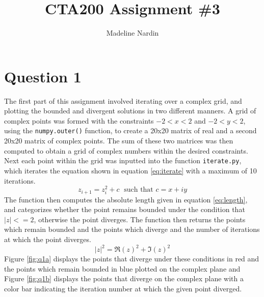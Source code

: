 \documentclass[10pt, preprint]{aastex}
\title{CTA200 Assignment \#3}
\author{Madeline Nardin}
\begin{document}
\section{Question 1}
The first part of this assignment involved iterating over a complex grid, and plotting the bounded and divergent solutions in two different manners. A grid of complex points was formed with the constraints $-2<x<2$ and $-2<y<2$, using the \texttt{numpy.outer()} function, to create a 20x20 matrix of real and a second 20x20 matrix of complex points. The sum of these two matrices was then computed to obtain a grid of complex numbers within the desired constraints. Next each point within the grid was inputted into the function \texttt{iterate.py}, which iterates the equation shown in equation \ref{eq:iterate} with a maximum of 10 iterations.
\begin{equation}\label{eq:iterate}
    z_{i+1} = z_i^2 +c \; \mbox{ such that } c = x + iy
\end{equation}
The function then computes the absolute length given in equation \ref{eq:length}, and categorizes whether the point remains bounded under the condition that $|z|<=2$, otherwise the point diverges. The function then returns the points which remain bounded and the points which diverge and the number of iterations at which the point diverges.
\begin{equation}\label{eq:length}
    |z|^2 = \Re(z)^2 + \Im(z)^2
\end{equation}
Figure \ref{fig:q1a} displays the points that diverge under these conditions in red and the points which remain bounded in blue plotted on the complex plane and Figure \ref{fig:q1b} displays the points that diverge on the complex plane with a color bar indicating the iteration number at which the given point diverged.
\end{document}
